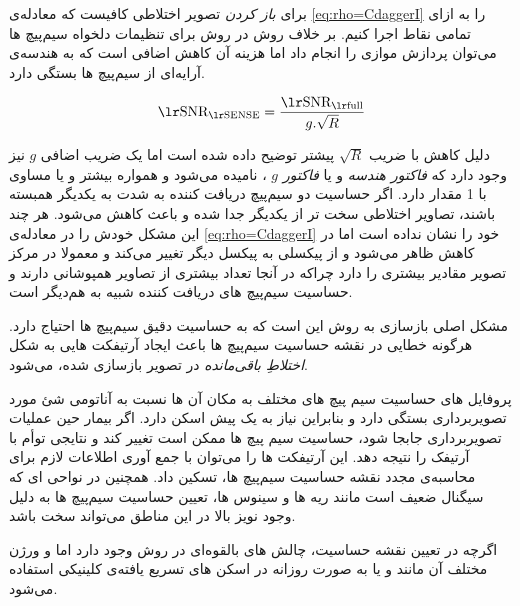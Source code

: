 برای \textit{باز کردن}
تصویر اختلاطی کافیست که معادله‌ی \ref{eq:rho=CdaggerI}
را به ازای تمامی نقاط اجرا کنیم. بر خلاف روش 
در روش 
برای تنظیمات دلخواه سیم‌پیچ ها می‌توان پردازش موازی را انجام داد اما هزینه آن کاهش اضافی  است که به هندسه‌ی آرایه‌ای از سیم‌پیچ ها بستگی دارد. 
\cite{SMASH-SENSE-PILS-GRAPPA--2004}

\removevspace
\begin{equation}
	\lrtext{SNR}_{\lrtext{SENSE}} = \dfrac{\lrtext{SNR}_{\lrtext{full}}}{g.\sqrt{R}} 
\end{equation}

دلیل کاهش  با ضریب $\sqrt{R}$ پیشتر توضیح داده شده است اما یک ضریب اضافی $g$ نیز وجود دارد که 
\textit{فاکتور هندسه}
و یا \textit{فاکتور $g$}
، نامیده می‌شود و همواره بیشتر و یا مساوی با 1 مقدار دارد. اگر حساسیت دو سیم‌پیچ دریافت کننده به شدت به یکدیگر همبسته باشند، تصاویر اختلاطی سخت تر از یکدیگر جدا شده و باعث کاهش 
 می‌شود. هر چند این مشکل خودش را در معادله‌ی \ref{eq:rho=CdaggerI}
خود را نشان نداده است اما در کاهش 
ظاهر می‌شود و از پیکسلی به پیکسل دیگر تغییر می‌کند و معمولا در مرکز تصویر مقادیر بیشتری را دارد چراکه در آنجا تعداد بیشتری از تصاویر همپوشانی دارند و حساسیت سیم‌پیچ های دریافت کننده شبیه به هم‌دیگر است.


مشکل اصلی بازسازی به روش 
این است که به حساسیت دقیق سیم‌پیچ ها احتیاج دارد. هرگونه خطایی در نقشه حساسیت سیم‌پیچ ها باعث ایجاد آرتیفکت هایی به شکل \textit{اختلاطِ باقی‌مانده} در تصویر بازسازی شده، می‌شود.
\cite{ParallelMRImaging2012}

پروفایل های حساسیت سیم پیچ های مختلف به مکان آن ها نسبت به آناتومی شئ مورد تصویربرداری  بستگی دارد و بنابراین نیاز به یک پیش اسکن دارد.
اگر بیمار حین عملیات تصویربرداری جابجا شود، حساسیت سیم پیچ ها ممکن است تغییر کند و نتایجی توأم با آرتیفک را نتیجه دهد.
این آرتیفکت ها را می‌توان با جمع آوری اطلاعات لازم برای محاسبه‌ی مجدد نقشه حساسیت سیم‌پیچ ها، تسکین داد. همچنین در نواحی ای که سیگنال ضعیف است مانند ریه ها و سینوس ها، تعیین حساسیت سیم‌پیچ ها به دلیل وجود نویز بالا در این مناطق می‌تواند سخت باشد.

اگرچه در تعیین نقشه حساسیت، چالش های بالقوه‌ای در روش 
وجود دارد اما 
و ورژن مختلف آن مانند 
و یا 
به صورت روزانه در اسکن های تسریع یافته‌ی کلینیکی استفاده می‌شود.
\cite{ParallelMRImaging2012}

\FloatBarrier
\subsection{}

